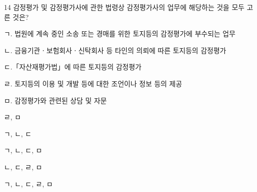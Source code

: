 \begin{question}{14}
감정평가 및 감정평가사에 관한 법령상 감정평가사의 업무에 해당하는 것을 모두 고른 것은?
\begin{framedtext}
ㄱ. 법원에 계속 중인 소송 또는 경매를 위한 토지등의 감정평가에 부수되는 업무 \par
ㄴ. 금융기관ㆍ보험회사ㆍ신탁회사 등 타인의 의뢰에 따른 토지등의 감정평가 \par
ㄷ.「자산재평가법」에 따른 토지등의 감정평가 \par
ㄹ. 토지등의 이용 및 개발 등에 대한 조언이나 정보 등의 제공 \par
ㅁ. 감정평가와 관련된 상담 및 자문 \par
\end{framedtext}
\begin{choices}
  \item ㄹ, ㅁ
  \item ㄱ, ㄴ, ㄷ
  \item ㄱ, ㄴ, ㄷ, ㅁ
  \item ㄴ, ㄷ, ㄹ, ㅁ
  \item ㄱ, ㄴ, ㄷ, ㄹ, ㅁ
\end{choices}
\end{question}
